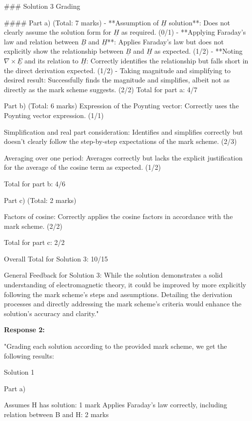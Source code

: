 \documentclass[a4paper,11pt]{article}
\begin{document}
### Solution 3 Grading

#### Part a) (Total: 7 marks)
- **Assumption of \(\underline{H}\) solution**: Does not clearly assume the solution form for \(\underline{H}\) as required. (0/1)
- **Applying Faraday's law and relation between \(\underline{B}\) and \(\underline{H}\)**: Applies Faraday's law but does not explicitly show the relationship between \(\underline{B}\) and \(\underline{H}\) as expected. (1/2)
- **Noting \(\nabla \times \underline{E}\) and its relation to \(\underline{H}\): Correctly identifies the relationship but falls short in the direct derivation expected. (1/2)
- Taking magnitude and simplifying to desired result: Successfully finds the magnitude and simplifies, albeit not as directly as the mark scheme suggests. (2/2)
Total for part a: 4/7

Part b) (Total: 6 marks)
Expression of the Poynting vector: Correctly uses the Poynting vector expression. (1/1)

Simplification and real part consideration: Identifies and simplifies correctly but doesn't clearly follow the step-by-step expectations of the mark scheme. (2/3)

Averaging over one period: Averages correctly but lacks the explicit justification for the average of the cosine term as expected. (1/2)

Total for part b: 4/6

Part c) (Total: 2 marks)

Factors of cosine: Correctly applies the cosine factors in accordance with the mark scheme. (2/2)

Total for part c: 2/2

Overall Total for Solution 3: 10/15

General Feedback for Solution 3:
While the solution demonstrates a solid understanding of electromagnetic theory, it could be improved by more explicitly following the mark scheme's steps and assumptions. Detailing the derivation processes and directly addressing the mark scheme's criteria would enhance the solution's accuracy and clarity."

\textbf{Response 2:}

"Grading each solution according to the provided mark scheme, we get the following results:

Solution 1

Part a)

Assumes H has solution: 1 mark
Applies Faraday's law correctly, including relation between B and H: 2 marks
\end{document}
